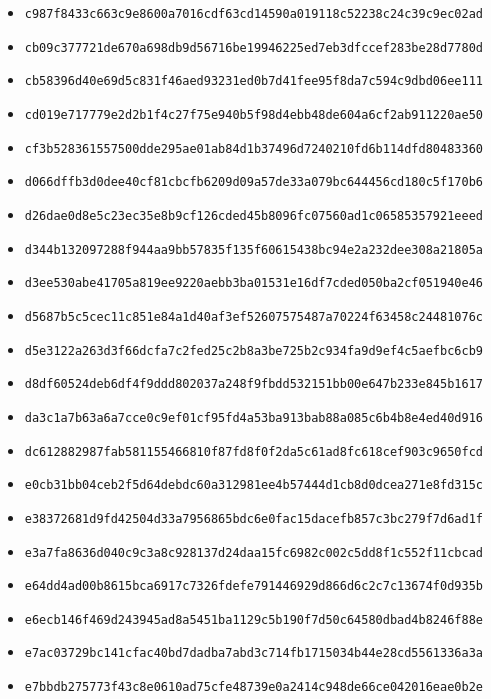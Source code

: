 {\begin{itemize}
    \item \texttt{c987f8433c663c9e8600a7016cdf63cd14590a019118c52238c24c39c9ec02ad}
    \item \texttt{cb09c377721de670a698db9d56716be19946225ed7eb3dfccef283be28d7780d}
    \item \texttt{cb58396d40e69d5c831f46aed93231ed0b7d41fee95f8da7c594c9dbd06ee111}
    \item \texttt{cd019e717779e2d2b1f4c27f75e940b5f98d4ebb48de604a6cf2ab911220ae50}
    \item \texttt{cf3b528361557500dde295ae01ab84d1b37496d7240210fd6b114dfd80483360}
    \item \texttt{d066dffb3d0dee40cf81cbcfb6209d09a57de33a079bc644456cd180c5f170b6}
    \item \texttt{d26dae0d8e5c23ec35e8b9cf126cded45b8096fc07560ad1c06585357921eeed}
    \item \texttt{d344b132097288f944aa9bb57835f135f60615438bc94e2a232dee308a21805a}
    \item \texttt{d3ee530abe41705a819ee9220aebb3ba01531e16df7cded050ba2cf051940e46}
    \item \texttt{d5687b5c5cec11c851e84a1d40af3ef52607575487a70224f63458c24481076c}
    \item \texttt{d5e3122a263d3f66dcfa7c2fed25c2b8a3be725b2c934fa9d9ef4c5aefbc6cb9}
    \item \texttt{d8df60524deb6df4f9ddd802037a248f9fbdd532151bb00e647b233e845b1617}
    \item \texttt{da3c1a7b63a6a7cce0c9ef01cf95fd4a53ba913bab88a085c6b4b8e4ed40d916}
    \item \texttt{dc612882987fab581155466810f87fd8f0f2da5c61ad8fc618cef903c9650fcd}
    \item \texttt{e0cb31bb04ceb2f5d64debdc60a312981ee4b57444d1cb8d0dcea271e8fd315c}
    \item \texttt{e38372681d9fd42504d33a7956865bdc6e0fac15dacefb857c3bc279f7d6ad1f}
    \item \texttt{e3a7fa8636d040c9c3a8c928137d24daa15fc6982c002c5dd8f1c552f11cbcad}
    \item \texttt{e64dd4ad00b8615bca6917c7326fdefe791446929d866d6c2c7c13674f0d935b}
    \item \texttt{e6ecb146f469d243945ad8a5451ba1129c5b190f7d50c64580dbad4b8246f88e}
    \item \texttt{e7ac03729bc141cfac40bd7dadba7abd3c714fb1715034b44e28cd5561336a3a}
    \item \texttt{e7bbdb275773f43c8e0610ad75cfe48739e0a2414c948de66ce042016eae0b2e}

\end{itemize}}
